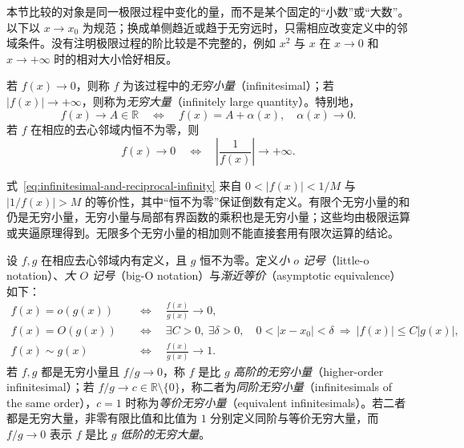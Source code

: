 \documentclass[UTF8,12pt,a4paper,fontset=fandol]{ctexbook}
\begin{document}
本节比较的对象是同一极限过程中变化的量，而不是某个固定的“小数”或“大数”。以下以 $x\to x_0$ 为规范；换成单侧趋近或趋于无穷远时，只需相应改变定义中的邻域条件。没有注明极限过程的阶比较是不完整的，例如 $x^2$ 与 $x$ 在 $x\to0$ 和 $x\to+\infty$ 时的相对大小恰好相反。

\begin{definition}
\label{def:infinitesimal-and-infinite-functions}
若 $f(x)\to0$，则称 $f$ 为该过程中的\emph{无穷小量}（infinitesimal）；若 $|f(x)|\to+\infty$，则称为\emph{无穷大量}（infinitely large quantity）。特别地，
\[
    f(x)\to A\in\mathbb{R}
    \quad\Longleftrightarrow\quad f(x)=A+\alpha(x),\quad\alpha(x)\to0.
\]
若 $f$ 在相应的去心邻域内恒不为零，则
\begin{equation}
    f(x)\to0
    \quad\Longleftrightarrow\quad
    \left|\frac1{f(x)}\right|\to+\infty.
    \label{eq:infinitesimal-and-reciprocal-infinity}
\end{equation}
\end{definition}

式~\eqref{eq:infinitesimal-and-reciprocal-infinity} 来自 $0<|f(x)|<1/M$ 与 $|1/f(x)|>M$ 的等价性，其中“恒不为零”保证倒数有定义。有限个无穷小量的和仍是无穷小量，无穷小量与局部有界函数的乘积也是无穷小量；这些均由极限运算或夹逼原理得到。无限多个无穷小量的相加则不能直接套用有限次运算的结论。

\begin{definition}
\label{def:little-o-big-o-and-asymptotic-equivalence}
设 $f,g$ 在相应去心邻域内有定义，且 $g$ 恒不为零。定义\emph{小 $o$ 记号}（little-o notation）、\emph{大 $O$ 记号}（big-O notation）与\emph{渐近等价}（asymptotic equivalence）如下：
\begin{equation}
    \begin{aligned}
        f(x)=o(g(x))
        &\quad\Longleftrightarrow\quad \frac{f(x)}{g(x)}\to0,\\
        f(x)=O(g(x))
        &\quad\Longleftrightarrow\quad
        \exists C>0,\ \exists\delta>0,\quad
        0<|x-x_0|<\delta\ \Longrightarrow\ |f(x)|\leq C|g(x)|,\\
        f(x)\sim g(x)
        &\quad\Longleftrightarrow\quad \frac{f(x)}{g(x)}\to1.
    \end{aligned}
    \label{eq:asymptotic-comparison-notations}
\end{equation}
若 $f,g$ 都是无穷小量且 $f/g\to0$，称 $f$ 是比 $g$ \emph{高阶的无穷小量}（higher-order infinitesimal）；若 $f/g\to c\in\mathbb{R}\setminus\{0\}$，称二者为\emph{同阶无穷小量}（infinitesimals of the same order），$c=1$ 时称为\emph{等价无穷小量}（equivalent infinitesimals）。若二者都是无穷大量，非零有限比值和比值为 $1$ 分别定义同阶与等价无穷大量，而 $f/g\to0$ 表示 $f$ 是比 $g$ \emph{低阶的无穷大量}。
\end{definition}
\end{document}
